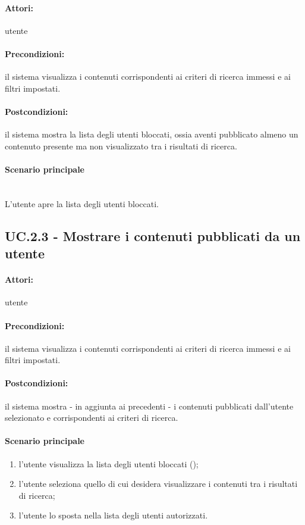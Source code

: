 \documentclass[10pt,a4paper,headinclude,footinclude,hidelinks]{scrreprt} %
\begin{document}
	\paragraph{Attori:} utente
	\paragraph{Precondizioni:} il sistema visualizza i contenuti corrispondenti ai criteri di ricerca immessi e ai filtri impostati.
	\paragraph{Postcondizioni:} il sistema mostra la lista degli utenti bloccati, ossia aventi pubblicato almeno un contenuto presente ma non visualizzato tra i risultati di ricerca.
	\paragraph{Scenario principale} \hfill \\
	L'utente apre la lista degli utenti bloccati.

	\subsection[UC.2.3]{UC.2.3 - Mostrare i contenuti pubblicati da un utente}
	\label{sec:stage:ar:uc:2_3}
	\paragraph{Attori:} utente
	\paragraph{Precondizioni:} il sistema visualizza i contenuti corrispondenti ai criteri di ricerca immessi e ai filtri impostati.
	\paragraph{Postcondizioni:} il sistema mostra - in aggiunta ai precedenti - i contenuti pubblicati dall'utente selezionato e corrispondenti ai criteri di ricerca.
	\paragraph{Scenario principale}
	\begin{enumerate}
	\item l'utente visualizza la lista degli utenti bloccati ();
	\item l'utente seleziona quello di cui desidera visualizzare i contenuti tra i risultati di ricerca;
	\item l'utente lo sposta nella lista degli utenti autorizzati.
	\end{enumerate}
\end{document}
